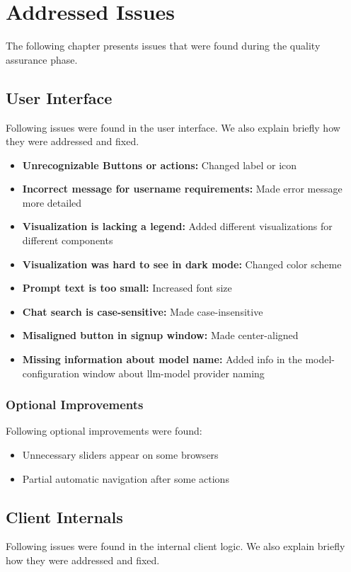 \chapter{Addressed Issues}
The following chapter presents issues that were found during the quality assurance phase.

\section{User Interface}\label{sec:user-interface}
Following issues were found in the user interface.
We also explain briefly how they were addressed and fixed.

\begin{itemize}
    \item \textbf{Unrecognizable Buttons or actions:} Changed label or icon
    \item \textbf{Incorrect message for username requirements:} Made error message more detailed
    \item \textbf{Visualization is lacking a legend:} Added different visualizations for different components
    \item \textbf{Visualization was hard to see in dark mode:} Changed color scheme
    \item \textbf{Prompt text is too small:} Increased font size
    \item \textbf{Chat search is case-sensitive:} Made case-insensitive
    \item \textbf{Misaligned button in signup window:} Made center-aligned
    \item \textbf{Missing information about model name:} Added info in the model-configuration window about llm-model provider naming
\end{itemize}

\subsection{Optional Improvements}
Following optional improvements were found:

\begin{itemize}
    \item Unnecessary sliders appear on some browsers
    \item Partial automatic navigation after some actions
\end{itemize}

\section{Client Internals}
Following issues were found in the internal client logic.
We also explain briefly how they were addressed and fixed.

